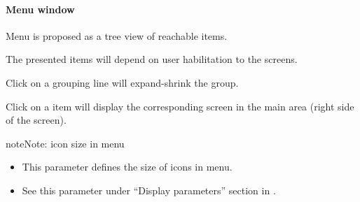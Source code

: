 \documentclass[letterpaper,10pt,english]{sphinxmanual}
\begin{document}
\paragraph{Menu window}

Menu is proposed as a tree view of reachable items.

The presented items will depend on user habilitation to the screens.

Click on a grouping line will expand-shrink the group.

Click on a item will display the corresponding screen in the main area (right side of the screen).
\begin{figure}[htbp]
\centering

\end{figure}

\begin{notice}{note}{Note:}
icon size in menu
\begin{itemize}
\item {} 
This parameter defines the size of icons in menu.

\item {} 
See this parameter under ``Display parameters'' section in {\hyperref[UserParameter:user-parameters-label]{\emph{}}}.

\end{itemize}
\end{notice}
\end{document}
